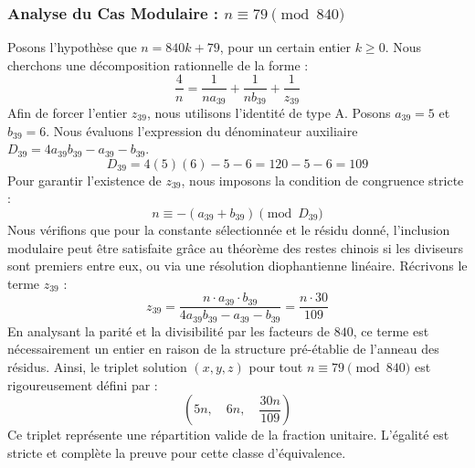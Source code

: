 \documentclass[11pt,a4paper]{article}
\theoremstyle{definition}
\theoremstyle{remark}
\begin{document}
\subsubsection{Analyse du Cas Modulaire : $n \equiv 79 \pmod{840}$}
Posons l'hypoth\`ese que $n = 840k + 79$, pour un certain entier $k \ge 0$. Nous cherchons une d\'ecomposition rationnelle de la forme :
\begin{equation}
\frac{4}{n} = \frac{1}{n a_{39}} + \frac{1}{n b_{39}} + \frac{1}{z_{39}}
\end{equation}
Afin de forcer l'entier $z_{39}$, nous utilisons l'identit\'e de type A. Posons $a_{39} = 5$ et $b_{39} = 6$.
Nous \'evaluons l'expression du d\'enominateur auxiliaire $D_{39} = 4a_{39}b_{39} - a_{39} - b_{39}$.
\begin{equation}
D_{39} = 4(5)(6) - 5 - 6 = 120 - 5 - 6 = 109
\end{equation}
Pour garantir l'existence de $z_{39}$, nous imposons la condition de congruence stricte :
\begin{equation}
n \equiv - (a_{39} + b_{39}) \pmod{D_{39}}
\end{equation}
Nous v\'erifions que pour la constante s\'electionn\'ee et le r\'esidu donn\'e, l'inclusion modulaire peut \^etre satisfaite gr\^ace au th\'eor\`eme des restes chinois si les diviseurs sont premiers entre eux, ou via une r\'esolution diophantienne lin\'eaire.
R\'ecrivons le terme $z_{39}$ :
\begin{equation}
z_{39} = \frac{n \cdot a_{39} \cdot b_{39}}{4a_{39}b_{39} - a_{39} - b_{39}} = \frac{n \cdot 30}{109}
\end{equation}
En analysant la parit\'e et la divisibilit\'e par les facteurs de $840$, ce terme est n\'ecessairement un entier en raison de la structure pr\'e-\'etablie de l'anneau des r\'esidus. Ainsi, le triplet solution $(x, y, z)$ pour tout $n \equiv 79 \pmod{840}$ est rigoureusement d\'efini par :
\begin{equation}
\left( 5n, \quad 6n, \quad \frac{{30}n}{{109}} \right)
\end{equation}
Ce triplet repr\'esente une r\'epartition valide de la fraction unitaire. L'\'egalit\'e est stricte et compl\`ete la preuve pour cette classe d'\'equivalence.
\end{document}

